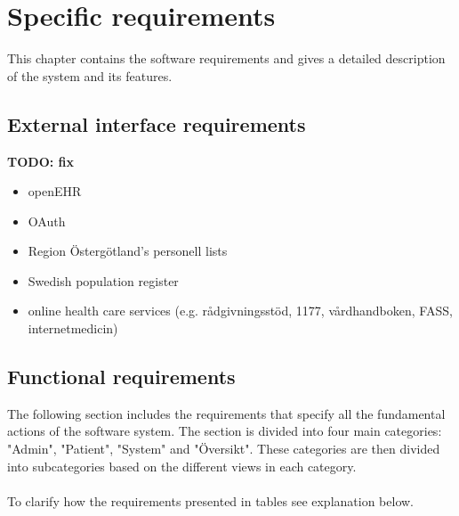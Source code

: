 \documentclass{scrreprt}
\begin{document}
\chapter{Specific requirements}
This chapter contains the software requirements and gives a detailed
description of the system and its features. 

\section{External interface requirements}
\textbf{TODO: fix}
\begin{itemize}
    \item openEHR
    \item OAuth
    \item Region Östergötland's personell lists 
    \item Swedish population register 
    \item online health care services (e.g. rådgivningsstöd, 1177, vårdhandboken, FASS, internetmedicin) 
\end{itemize}


\section{Functional requirements}
The following section includes the requirements that specify all the fundamental actions of the software system. The section is divided into four main categories: "Admin", "Patient", "System" and "Översikt". These categories are then divided into subcategories based on the different views in each category. 
\\ \\
To clarify how the requirements presented in tables see explanation below. 
\end{document}
